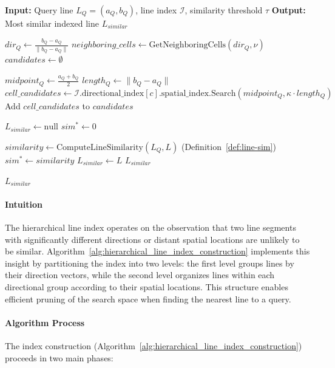 \documentclass[numbers,sort]{article}
\begin{document}
\begin{algorithm}
\caption{Find Nearest Line}
\label{alg:find_nearest_line}
\begin{algorithmic}[1]
\STATE \textbf{Input:} Query line $L_Q = (a_Q, b_Q)$, line index $\mathcal{I}$, similarity threshold $\tau$
\STATE \textbf{Output:} Most similar indexed line $L_{similar}$

\STATE $dir_Q \leftarrow \frac{b_Q-a_Q}{\|b_Q-a_Q\|}$ 
\STATE $neighboring\_cells \leftarrow \text{GetNeighboringCells}(dir_Q, \nu)$ 
\STATE $candidates \leftarrow \emptyset$

    \STATE $midpoint_Q \leftarrow \frac{a_Q+b_Q}{2}$ 
    \STATE $length_Q \leftarrow \|b_Q-a_Q\|$ 
    \STATE $cell\_candidates \leftarrow \mathcal{I}.\text{directional\_index}[c].\text{spatial\_index}.\text{Search}(midpoint_Q, \kappa \cdot length_Q)$
    \STATE Add $cell\_candidates$ to $candidates$
\ENDFOR

\STATE $L_{similar} \leftarrow \text{null}$
\STATE $sim^*\leftarrow 0$

    \STATE $similarity \leftarrow \text{ComputeLineSimilarity}(L_Q, L)$ (Definition~\ref{def:line-sim})
        \STATE $sim^* \leftarrow similarity$
        \STATE $L_{similar} \leftarrow L$
    \ENDIF
        \RETURN $L_{similar}$
    \ENDIF
\ENDFOR

\RETURN $L_{similar}$
\end{algorithmic}
\end{algorithm}

\paragraph{Intuition} The hierarchical line index operates on the observation that two line segments with significantly different directions or distant spatial locations are unlikely to be similar. Algorithm~\ref{alg:hierarchical_line_index_construction} implements this insight by partitioning the index into two levels: the first level groups lines by their direction vectors, while the second level organizes lines within each directional group according to their spatial locations. This structure enables efficient pruning of the search space when finding the nearest line to a query.

\paragraph{Algorithm Process} The index construction (Algorithm~\ref{alg:hierarchical_line_index_construction}) proceeds in two main phases:
\end{document}
